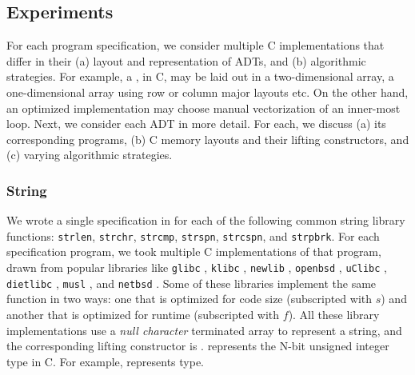 \subsection{Experiments}
For each \SpecL{} program specification, we consider multiple
C implementations that differ in their (a) layout and representation of ADTs, and
(b) algorithmic strategies. For example, a , in C, may be laid out
in a two-dimensional array, a one-dimensional array using row or column major
layouts etc. On the other hand, an optimized implementation may choose manual vectorization
of an inner-most loop. Next, we consider each ADT in more detail. For each,
we discuss (a) its corresponding programs, (b) C memory layouts and their lifting
constructors, and (c) varying algorithmic strategies.




\subsubsection{String} We wrote a single specification in \SpecL{} for each of the
following
common string library functions: {\tt strlen}, {\tt strchr}, {\tt strcmp}, {\tt strspn},
{\tt strcspn}, and {\tt strpbrk}.  For each specification
program, we took multiple C implementations of that program, drawn from popular
libraries like {\tt glibc} \cite{glibc}, {\tt klibc} \cite{klibc}, {\tt newlib} \cite{newlib},
{\tt openbsd} \cite{openbsdlibc}, {\tt uClibc} \cite{uclibc},
{\tt dietlibc} \cite{dietlibc}, {\tt musl} \cite{musl}, and {\tt netbsd} \cite{netbsd}.
Some of these libraries implement the same function in two ways: one that is optimized
for code size (subscripted with $s$) and another that is optimized for runtime (subscripted with $f$).
All these library implementations use a {\em null character} terminated array to represent
a string, and the
corresponding lifting constructor is .
 represents the N-bit unsigned integer type in C.
For example,  represents  type.

